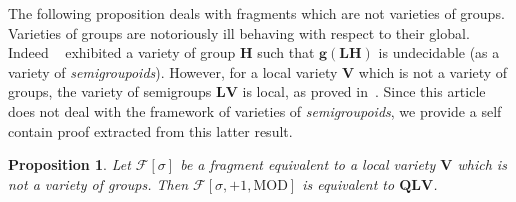 \documentclass[submission,hidelink]{dmtcs-episciences}
\newtheorem{proposition}[theorem]{Proposition}
\newcommand{\QLV}{\mathbf{QLV}}
\newcommand{\LV}{\mathbf{LV}}
\newcommand{\V}{\mathbf{V}}
\newcommand{\cF}{\mathcal{F}}
\newcommand{\MOD}{\mathrm{MOD}}
\begin{document}
The following proposition deals with fragments which are not varieties of groups. Varieties of groups are notoriously ill behaving with respect to their global. Indeed ~\cite{Auinger10} exhibited a variety of group $\mathbf{H}$ such that
$\mathbf{g(LH)}$ is undecidable (as a variety of \emph{semigroupoids}). However, for a local variety $\V$ which is not a variety of groups, the
variety of semigroups $\LV$ is local, as proved in~\cite{PapermanPhd}. Since this article does not deal with the framework
of varieties of \emph{semigroupoids}, we provide a self contain proof extracted from this latter result.

\begin{proposition}\label{prop:QLV}
		Let $\cF[\sigma]$ be a
		 fragment equivalent to a local variety $\V$ which is not a variety of groups.
		Then $\cF[\sigma,+1,\MOD]$
		is equivalent to $\QLV$.
\end{proposition}
\end{document}
